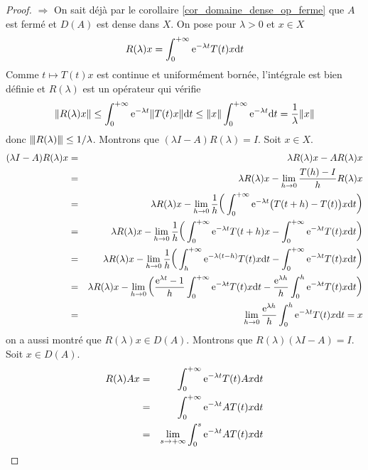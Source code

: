 \begin{proof}
    $\boxed{\Longrightarrow}$ On sait déjà par le corollaire \ref{cor_domaine_dense_op_ferme} que $A$ est fermé et $D(A)$ est dense dans $X$. On pose pour $\lambda >0$ et $x \in X$
    \begin{equation*}
        R(\lambda)x=\int_0^{+\infty}\mathrm{e}^{-\lambda t}T(t)x\mathrm{d} t
    \end{equation*}
    Comme $t \mapsto T(t)x$ est continue et uniformément bornée, l'intégrale est bien définie et $R(\lambda)$ est un opérateur qui vérifie 
    \begin{eqnarray*}
        \|R(\lambda)x\| \leq \int_0^{+\infty}\mathrm{e}^{-\lambda t}\|T(t)x\|\mathrm{d} t \leq \|x\| \int_0^{+\infty}\mathrm{e}^{-\lambda t}\mathrm{d} t=\frac{1}{\lambda}\|x\|
    \end{eqnarray*}
    donc ${\left\vert\kern-0.25ex\left\vert \kern-0.25ex\left\vert R(\lambda) \right\vert\kern-0.25ex\right\vert\kern-0.25ex\right\vert} \leq 1/\lambda$. Montrons que $(\lambda I-A)R(\lambda)=I$. Soit $x \in X$.
    \begin{eqnarray*}
        (\lambda I-A)R(\lambda)x &=& \lambda R(\lambda)x-AR(\lambda)x \\
        &=& \lambda R(\lambda)x - \lim_{h \to 0}\frac{T(h)-I}{h}R(\lambda)x \\
        &=& \lambda R(\lambda)x-\lim_{h \to 0}\frac{1}{h}\bigg(\int_0^{+\infty}\mathrm{e}^{-\lambda t}\big(T(t+h)-T(t)\big)x\mathrm{d} t\bigg) \\
        &=& \lambda R(\lambda)x-\lim_{h \to 0}\frac{1}{h}\bigg(\int_0^{+\infty}\mathrm{e}^{-\lambda t}T(t+h)x-\int_0^{+\infty}\mathrm{e}^{-\lambda t}T(t)x\mathrm{d} t\bigg) \\
        &=& \lambda R(\lambda)x-\lim_{h \to 0}\frac{1}{h}\bigg(\int_h^{+\infty}\mathrm{e}^{-\lambda (t-h)}T(t)x\mathrm{d} t-\int_0^{+\infty}\mathrm{e}^{-\lambda t}T(t)x\mathrm{d} t\bigg) \\
        &=& \lambda R(\lambda)x-\lim_{h \to 0}\bigg(\frac{\mathrm{e}^{\lambda t}-1}{h}\int_0^{+\infty}\mathrm{e}^{-\lambda t}T(t)x\mathrm{d} t-\frac{\mathrm{e}^{\lambda h}}{h}\int_0^{h}\mathrm{e}^{-\lambda t}T(t)x\mathrm{d} t\bigg) \\
        &=& \lim_{h \to 0} \frac{\mathrm{e}^{\lambda h}}{h} \int_0^h\mathrm{e}^{-\lambda t}T(t)x\mathrm{d} t = x
    \end{eqnarray*}
    on a aussi montré que $R(\lambda)x \in D(A)$. Montrons que $R(\lambda)(\lambda I-A)=I$. Soit $x \in D(A)$.
    \begin{eqnarray*}
        R(\lambda)Ax &=& \int_0^{+\infty}\ex^{-\lambda t}T(t)Ax\d t \\
        &=& \int_0^{+\infty}\ex^{-\lambda t}AT(t)x\d t \\
        &=& \lim_{s \to +\infty} \int_0^s \ex^{-\lambda t}AT(t)x\d t \\

\end{eqnarray*}
\end{proof}
